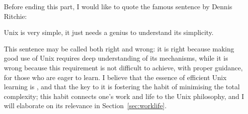 Before ending this part, I would like to quote
the famous sentence by Dennis Ritchie:\mbox{}
\begin{quoting}
	Unix is very simple, it just needs a genius to understand its simplicity.
\end{quoting}
This sentence may be called both right and wrong: it is right because
making good use of Unix requires deep understanding of its mechanisms, while
it is wrong because this requirement is not difficult to achieve, with proper
guidance, for those who are eager to learn.  I believe that the essence of
efficient Unix learning is , and that the key to it is fostering the habit of minimising the total
complexity; this habit connects one's work and life to the Unix philosophy,
and I will elaborate on its relevance in Section~\ref{sec:worklife}.

